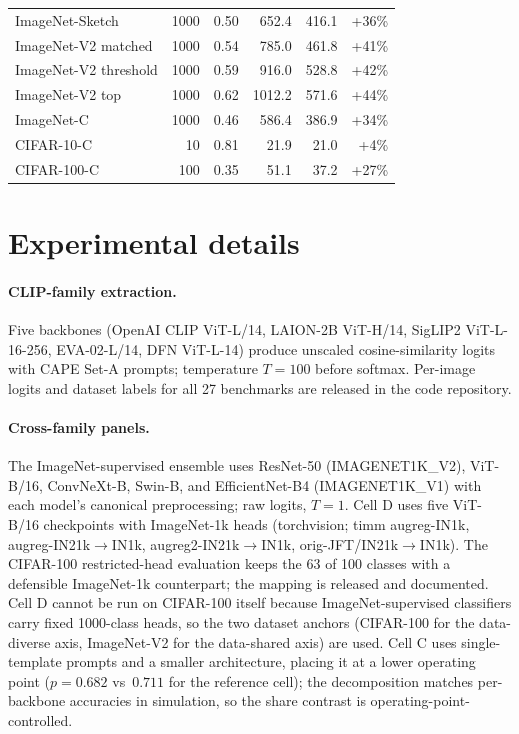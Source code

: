 \documentclass[a4paper,fleqn]{cas-sc}
\begin{document}
\begin{table}[h]
\begin{tabular}{lrrrrr}
ImageNet-Sketch      & 1000 & 0.50 & 652.4 & 416.1 & +36\% \\
ImageNet-V2 matched  & 1000 & 0.54 & 785.0 & 461.8 & +41\% \\
ImageNet-V2 threshold & 1000 & 0.59 & 916.0 & 528.8 & +42\% \\
ImageNet-V2 top      & 1000 & 0.62 & 1012.2 & 571.6 & +44\% \\
ImageNet-C           & 1000 & 0.46 & 586.4 & 386.9 & +34\% \\
CIFAR-10-C           & 10   & 0.81 & 21.9 & 21.0 & +4\% \\
CIFAR-100-C          & 100  & 0.35 & 51.1 & 37.2 & +27\% \\
\bottomrule
\end{tabular}
\end{table}

\section{Experimental details}
\label{sec:exp_details}

\paragraph{CLIP-family extraction.}
Five backbones (OpenAI CLIP ViT-L/14, LAION-2B ViT-H/14, SigLIP2 ViT-L-16-256, EVA-02-L/14, DFN ViT-L-14) produce unscaled cosine-similarity logits with CAPE Set-A prompts; temperature $T{=}100$ before softmax.
Per-image logits and dataset labels for all 27 benchmarks are released in the code repository.

\paragraph{Cross-family panels.}
The ImageNet-supervised ensemble uses ResNet-50 (IMAGENET1K\_V2), ViT-B/16, ConvNeXt-B, Swin-B, and EfficientNet-B4 (IMAGENET1K\_V1) with each model's canonical preprocessing; raw logits, $T{=}1$.
Cell D uses five ViT-B/16 checkpoints with ImageNet-1k heads (torchvision; timm augreg-IN1k, augreg-IN21k$\rightarrow$IN1k, augreg2-IN21k$\rightarrow$IN1k, orig-JFT/IN21k$\rightarrow$IN1k).
The CIFAR-100 restricted-head evaluation keeps the 63 of 100 classes with a defensible ImageNet-1k counterpart; the mapping is released and documented.
Cell D cannot be run on CIFAR-100 itself because ImageNet-supervised classifiers carry fixed 1000-class heads, so the two dataset anchors (CIFAR-100 for the data-diverse axis, ImageNet-V2 for the data-shared axis) are used.
Cell C uses single-template prompts and a smaller architecture, placing it at a lower operating point ($p{=}0.682$ vs~$0.711$ for the reference cell); the decomposition matches per-backbone accuracies in simulation, so the share contrast is operating-point-controlled.
\end{document}

